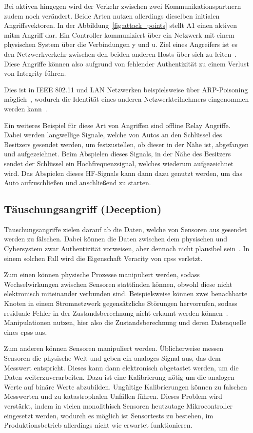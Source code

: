 \documentclass[final,bibliography=totocnumbered]{include/sikseminar}
\newcommand{\cps}{\glspl{cps}\xspace}
\begin{document}
Bei aktiven hingegen wird der Verkehr zwischen zwei Kommunikationspartnern zudem noch verändert.
Beide Arten nutzen allerdings dieselben initialen Angriffsvektoren.
In der Abbildung~\ref{fig:attack_points} stellt A1 einen aktiven \gls{mitm} Angriff dar.
Ein Controller kommuniziert über ein Netzwerk mit einem physischen System über die Verbindungen y und u.
Ziel eines Angreifers ist es den Netzwerkverkehr zwischen den beiden anderen Hosts über sich zu leiten~\cite{WYX+10,FPA+18}.
Diese Angriffe können also aufgrund von fehlender Authentizität zu einem Verlust von Integrity führen.

Dies ist in IEEE 802.11 und LAN Netzwerken beispielsweise über ARP-Poisoning möglich~\cite{FIT+12}, wodurch die Identität eines anderen Netzwerkteilnehmers eingenommen werden kann~\cite{RN05}.

Ein weiteres Beispiel für diese Art von Angriffen sind offline Relay Angriffe.
Dabei werden langwellige Signale, welche von Autos an den Schlüssel des Besitzers gesendet werden, um festzustellen, ob dieser in der Nähe ist, abgefangen und aufgezeichnet.
Beim Abspielen dieses Signals, in der Nähe des Besitzers sendet der Schlüssel ein Hochfrequenzsignal, welches wiederum aufgezeichnet wird.
Das Abspielen dieses HF-Signals kann dann dazu genutzt werden, um das Auto aufzuschließen und anschließend zu starten.~\cite{HLL+17}

\subsection{Täuschungsangriff (Deception)}\label{subsec:tauschung} %
Täuschungsangriffe zielen darauf ab die Daten, welche von Sensoren aus gesendet werden zu fälschen.
Dabei können die Daten zwischen dem physischen und Cybersystem zwar Authentizität vorweisen, aber dennoch nicht plausibel sein~\cite{SFJ17}.
In einem solchen Fall wird die Eigenschaft Veracity von \cps verletzt.

Zum einen können physische Prozesse manipuliert werden, sodass Wechselwirkungen zwischen Sensoren stattfinden können, obwohl diese nicht elektronisch miteinander verbunden sind.
Beispielsweise können zwei benachbarte Knoten in einem Stromnetzwerk gegensätzliche Störungen hervorrufen, sodass residuale Fehler in der Zustandsberechnung nicht erkannt werden können~\cite{KLG15}.
Manipulationen nutzen, hier also die Zustandsberechnung und deren Datenquelle eines \cps aus.

Zum anderen können Sensoren manipuliert werden.
Üblicherweise messen Sensoren die physische Welt und geben ein analoges Signal aus, das dem Messwert entspricht.
Dieses kann dann elektronisch abgetastet werden, um die Daten weiterzuverarbeiten.
Dazu ist eine Kalibrierung nötig um die analogen Werte auf binäre Werte abzubilden.
Ungültige Kalibrierungen können zu falschen Messwerten und zu katastrophalen Unfällen führen.
Dieses Problem wird verstärkt, indem in vielen monolithisch Sensoren heutzutage Mikrocontroller eingesetzt werden, wodurch es möglich ist Sensortests zu bestehen, im Produktionsbetrieb allerdings nicht wie erwartet funktionieren.~\cite{KLG15}
\end{document}
